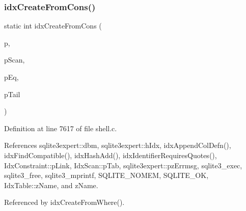 \subsubsection{idx\+Create\+From\+Cons()}
{\footnotesize\ttfamily static int idx\+Create\+From\+Cons (\begin{DoxyParamCaption}\item[{\textbf{ sqlite3expert} $\ast$}]{p,  }\item[{\textbf{ Idx\+Scan} $\ast$}]{p\+Scan,  }\item[{\textbf{ Idx\+Constraint} $\ast$}]{p\+Eq,  }\item[{\textbf{ Idx\+Constraint} $\ast$}]{p\+Tail }\end{DoxyParamCaption})\hspace{0.3cm}{\ttfamily [static]}}



Definition at line 7617 of file shell.\+c.



References sqlite3expert\+::dbm, sqlite3expert\+::h\+Idx, idx\+Append\+Col\+Defn(), idx\+Find\+Compatible(), idx\+Hash\+Add(), idx\+Identifier\+Requires\+Quotes(), Idx\+Constraint\+::p\+Link, Idx\+Scan\+::p\+Tab, sqlite3expert\+::pz\+Errmsg, sqlite3\+\_\+exec, sqlite3\+\_\+free, sqlite3\+\_\+mprintf, S\+Q\+L\+I\+T\+E\+\_\+\+N\+O\+M\+EM, S\+Q\+L\+I\+T\+E\+\_\+\+OK, Idx\+Table\+::z\+Name, and z\+Name.



Referenced by idx\+Create\+From\+Where().


